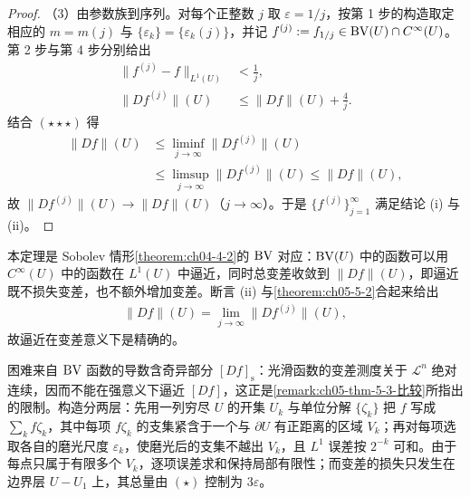 \documentclass[../../main.tex]{subfiles}%
\begin{document}
\begin{proof}
（3）由参数族到序列。对每个正整数 $j$ 取 $\varepsilon=1/j$，按第 1 步的构造取定相应的 $m=m(j)$ 与 $\{\varepsilon_k\}=\{\varepsilon_k(j)\}$，并记 $f^{(j)}:=f_{1/j}\in\mathrm{BV}(U)\cap C^{\infty}(U)$。第 2 步与第 4 步分别给出
\begin{align*}
\lVert f^{(j)}-f\rVert_{L^1(U)}&<\frac{1}{j},\\
\lVert Df^{(j)}\rVert(U)&\leqslant\lVert Df\rVert(U)+\frac{4}{j}.
\end{align*}
结合 $(\star\star\star)$ 得
\begin{align*}
\lVert Df\rVert(U)&\leqslant\liminf_{j\to\infty}\lVert Df^{(j)}\rVert(U)\\
&\leqslant\limsup_{j\to\infty}\lVert Df^{(j)}\rVert(U)\leqslant\lVert Df\rVert(U),
\end{align*}
故 $\lVert Df^{(j)}\rVert(U)\to\lVert Df\rVert(U)$（$j\to\infty$）。于是 $\{f^{(j)}\}_{j=1}^{\infty}$ 满足结论 (i) 与 (ii)。
\end{proof}

\begin{remark}\label{remark:ch05-thm-5-3-动机}
本定理是 Sobolev 情形\cref{theorem:ch04-4-2}的 $\mathrm{BV}$ 对应：$\mathrm{BV}(U)$ 中的函数可以用 $C^{\infty}(U)$ 中的函数在 $L^1(U)$ 中逼近，同时总变差收敛到 $\lVert Df\rVert(U)$，即逼近既不损失变差，也不额外增加变差。断言 (ii) 与\cref{theorem:ch05-5-2}合起来给出%
\begin{align*}
\lVert Df\rVert(U)=\lim_{j\to\infty}\lVert Df^{(j)}\rVert(U),
\end{align*}
故逼近在变差意义下是精确的。

困难来自 $\mathrm{BV}$ 函数的导数含奇异部分 $[Df]_{\mathrm{s}}$：光滑函数的变差测度关于 $\mathcal{L}^n$ 绝对连续，因而不能在强意义下逼近 $[Df]$，这正是\cref{remark:ch05-thm-5-3-比较}所指出的限制。构造分两层：先用一列穷尽 $U$ 的开集 $U_k$ 与单位分解 $\{\zeta_k\}$ 把 $f$ 写成 $\sum_kf\zeta_k$，其中每项 $f\zeta_k$ 的支集紧含于一个与 $\partial U$ 有正距离的区域 $V_k$；再对每项选取各自的磨光尺度 $\varepsilon_k$，使磨光后的支集不越出 $V_k$，且 $L^1$ 误差按 $2^{-k}$ 可和。由于每点只属于有限多个 $V_k$，逐项误差求和保持局部有限性；而变差的损失只发生在边界层 $U-U_1$ 上，其总量由 $(\star)$ 控制为 $3\varepsilon$。%
\end{remark}
\end{document}

